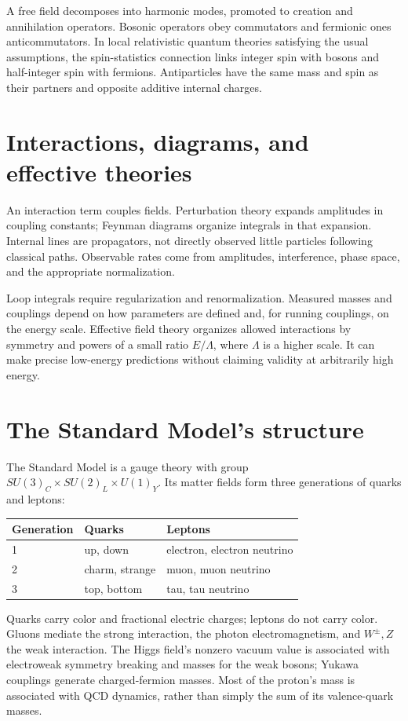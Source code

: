 \documentclass[11pt,oneside]{book}
\theoremstyle{reviewstyle}
\begin{document}
A free field decomposes into harmonic modes, promoted to creation and annihilation operators. Bosonic operators obey commutators and fermionic ones anticommutators. In local relativistic quantum theories satisfying the usual assumptions, the spin-statistics connection links integer spin with bosons and half-integer spin with fermions. Antiparticles have the same mass and spin as their partners and opposite additive internal charges.
\section{Interactions, diagrams, and effective theories}
An interaction term couples fields. Perturbation theory expands amplitudes in coupling constants; Feynman diagrams organize integrals in that expansion. Internal lines are propagators, not directly observed little particles following classical paths. Observable rates come from amplitudes, interference, phase space, and the appropriate normalization.

Loop integrals require regularization and renormalization. Measured masses and couplings depend on how parameters are defined and, for running couplings, on the energy scale. Effective field theory organizes allowed interactions by symmetry and powers of a small ratio $E/\Lambda$, where $\Lambda$ is a higher scale. It can make precise low-energy predictions without claiming validity at arbitrarily high energy.
\section{The Standard Model's structure}
The Standard Model is a gauge theory with group $SU(3)_C\times SU(2)_L\times U(1)_Y$. Its matter fields form three generations of quarks and leptons:
\begin{center}
\begin{tabular}{lll}
\toprule
Generation & Quarks & Leptons\\
\midrule
1 & up, down & electron, electron neutrino\\
2 & charm, strange & muon, muon neutrino\\
3 & top, bottom & tau, tau neutrino\\
\bottomrule
\end{tabular}
\end{center}
Quarks carry color and fractional electric charges; leptons do not carry color. Gluons mediate the strong interaction, the photon electromagnetism, and $W^\pm,Z$ the weak interaction. The Higgs field's nonzero vacuum value is associated with electroweak symmetry breaking and masses for the weak bosons; Yukawa couplings generate charged-fermion masses. Most of the proton's mass is associated with QCD dynamics, rather than simply the sum of its valence-quark masses.
\end{document}
